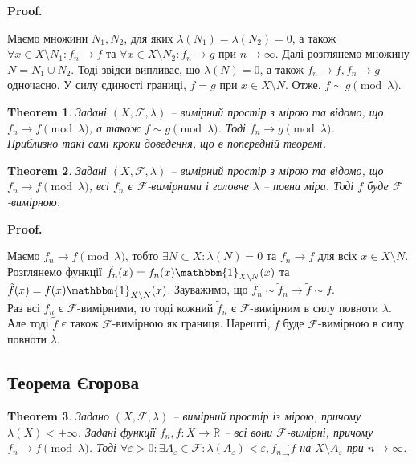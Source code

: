 \documentclass[a4paper, 10pt]{article}
\makeatletter
\theoremstyle{theoremdd}
\newtheorem{theorem}{Theorem}[subsection]
\renewenvironment{proof}[1][Proof.\\]{\par
\pushQED{\hfill \qed}%
\normalfont \topsep6\p@\@plus6\p@\relax
\trivlist
\item\relax
{\bfseries
#1\@addpunct{.}}\hspace\labelsep\ignorespaces
}{%
\popQED\endtrivlist\@endpefalse
}
\makeatother
\begin{document}
\begin{proof}
Маємо множини $N_1,N_2$, для яких $\lambda(N_1) = \lambda(N_2) = 0$, а також $\forall x \in X \setminus N_1: f_n \to f$ та $\forall x \in X \setminus N_2: f_n \to g$ при $n \to \infty$. Далі розглянемо множину $N = N_1 \cup N_2$. Тоді звідси випливає, що $\lambda(N) = 0$, а також $f_n \to f, f_n \to g$ одночасно. У силу єдиності границі, $f = g$ при $x \in X \setminus N$. Отже, $f \sim g \pmod \lambda$. 
\end{proof}

\begin{theorem}
Задані $(X,\mathcal{F},\lambda)$ -- вимірний простір з мірою та відомо, що $f_n \to f \pmod \lambda$, а також $f \sim g \pmod \lambda$. Тоді $f_n \to g \pmod \lambda$.\\
\textit{Приблизно такі самі кроки доведення, що в попередній теоремі.}
\end{theorem}

\begin{theorem}
Задані $(X,\mathcal{F},\lambda)$ -- вимірний простір з мірою та відомо, що $f_n \to f \pmod \lambda$, всі $f_n$ є $\mathcal{F}$-вимірними і головне $\lambda$ -- повна міра. Тоді $f$ буде $\mathcal{F}$-вимірною.
\end{theorem}

\begin{proof}
Маємо $f_n \to f \pmod \lambda$, тобто $\exists N \subset X: \lambda(N) = 0$ та $f_n \to f$ для всіх $x \in X \setminus N$.\\
Розглянемо функції $\tilde{f}_n(x) = f_n(x) \mathbbm{1}_{X \setminus N}(x)$ та $\tilde{f}(x) = f(x) \mathbbm{1}_{X \setminus N}(x)$. Зауважимо, що $f_n \sim \tilde{f}_n \to \tilde{f} \sim f$.\\
Раз всі $f_n$ є $\mathcal{F}$-вимірними, то тоді кожний $\tilde{f}_n$ є $\mathcal{F}$-вимірним в силу повноти $\lambda$. Але тоді $\tilde{f}$ є також $\mathcal{F}$-вимірною як границя. Нарешті, $f$ буде $\mathcal{F}$-вимірною в силу повноти $\lambda$.
\end{proof}

\subsection{Теорема Єгорова}
\begin{theorem}
Задано $(X,\mathcal{F},\lambda)$ -- вимірний простір із мірою, причому $\lambda(X) < +\infty$. Задані функції $f_n,f \colon X \to \mathbb{R}$ -- всі вони $\mathcal{F}$-вимірні, причому $f_n \to f \pmod \lambda$. Тоді $\forall \varepsilon > 0: \exists A_\varepsilon \in \mathcal{F}: \lambda(A_\varepsilon) < \varepsilon, {f_n}^\rightarrow_\rightarrow f$ на $X \setminus A_\varepsilon$ при $n \to \infty$.
\end{theorem}
\end{document}
